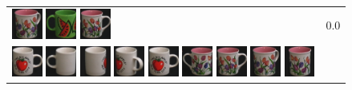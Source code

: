 \begin{figure}[tbp]
\begin{center}
\begin{tabular}{m{11cm} | m{3cm} |}
\includegraphics[width=1cm]{coil/beeld-9.eps}
\includegraphics[width=1cm]{coil/beeld-31.eps}
\includegraphics[width=1cm]{coil/beeld-6.eps}
& {\scriptsize 0.0}
\\
\includegraphics[width=1cm]{coil/beeld-36.eps}
\includegraphics[width=1cm]{coil/beeld-37.eps}
\includegraphics[width=1cm]{coil/beeld-38.eps}
\includegraphics[width=1cm]{coil/beeld-40.eps}
\includegraphics[width=1cm]{coil/beeld-36.eps}
\includegraphics[width=1cm]{coil/beeld-7.eps}
\includegraphics[width=1cm]{coil/beeld-6.eps}
\includegraphics[width=1cm]{coil/beeld-9.eps}
\includegraphics[width=1cm]{coil/beeld-8.eps}

\end{tabular}
\end{center}
\end{figure}
